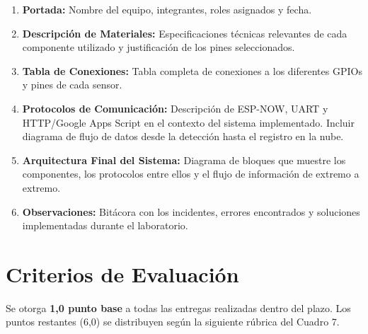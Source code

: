 \documentclass[12pt,leqno]{article}
\begin{document}
\begin{enumerate}[(1)]
    \item \textbf{Portada:} Nombre del equipo, integrantes, roles asignados y fecha.
    \item \textbf{Descripci\'on de Materiales:} Especificaciones t\'ecnicas
    relevantes de cada componente utilizado y justificaci\'on de los pines
    seleccionados.
    \item \textbf{Tabla de Conexiones:} Tabla completa de conexiones a los diferentes GPIOs y pines de cada sensor.
    \item \textbf{Protocolos de Comunicaci\'on:} Descripci\'on de ESP-NOW, UART y
    HTTP/Google Apps Script en el contexto del sistema implementado. Incluir diagrama
    de flujo de datos desde la detecci\'on hasta el registro en la nube.
    \item \textbf{Arquitectura Final del Sistema:} Diagrama de bloques que muestre
    los componentes, los protocolos entre ellos y el flujo de informaci\'on de
    extremo a extremo.
    \item \textbf{Observaciones:} Bit\'acora con los incidentes, errores encontrados
    y soluciones implementadas durante el laboratorio.
\end{enumerate}

\section{Criterios de Evaluaci\'on}

Se otorga \textbf{1,0 punto base} a todas las entregas realizadas
dentro del plazo. Los puntos restantes (6,0) se distribuyen seg\'un la siguiente
r\'ubrica del Cuadro 7.
\end{document}
